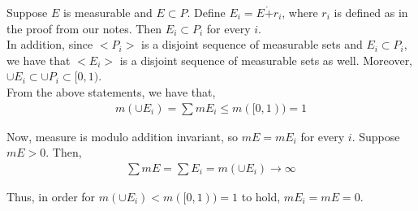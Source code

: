 \documentclass[12pt]{article}
\begin{document}
Suppose $E$ is measurable and $E \subset P$. Define $E_i = E \mathring{+} r_i$, where $r_i$ is defined as in the proof from our notes. Then $E_i \subset P_i$ for every $i$.\\

In addition, since $<P_i>$ is a disjoint sequence of measurable sets and $E_i \subset P_i$, we have that $<E_i>$ is a disjoint sequence of measurable sets as well. Moreover, $\cup E_i \subset \cup P_i \subset [0, 1)$.\\

From the above statements, we have that,
\begin{align*}
m(\cup E_i) = \sum mE_i \leq m([0, 1)) = 1
\end{align*}

Now, measure is modulo addition invariant, so $mE = mE_i$ for every $i$. Suppose $mE > 0$. Then,
\begin{align*}
\sum mE = \sum E_i = m(\cup E_i) \to \infty
\end{align*}

Thus, in order for $m(\cup E_i) < m([0, 1)) = 1$ to hold, $mE_i = mE = 0$.
\end{document}
